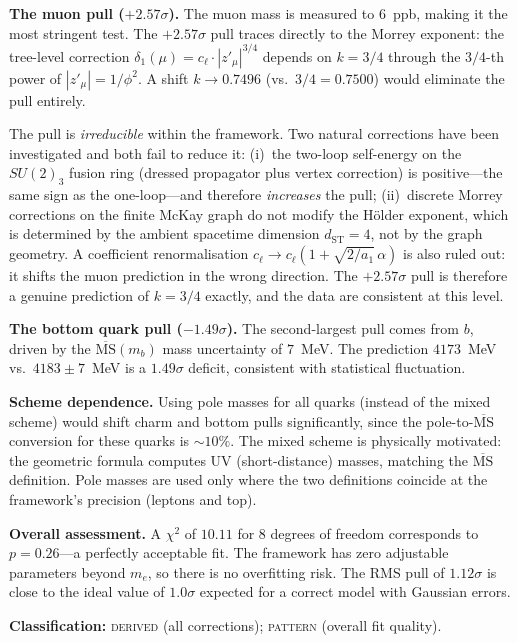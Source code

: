 \documentclass[12pt,a4paper]{article}
\theoremstyle{definition}
\begin{document}
\textbf{The muon pull ($+2.57\sigma$).}  The muon mass is measured to $6$~ppb, making it the most stringent test.  The $+2.57\sigma$ pull traces directly to the Morrey exponent: the tree-level correction $\delta_1(\mu) = c_\ell \cdot |z'_\mu|^{3/4}$ depends on $k = 3/4$ through the $3/4$-th power of $|z'_\mu| = 1/\phi^2$.  A shift $k \to 0.7496$ (vs.\ $3/4 = 0.7500$) would eliminate the pull entirely.

The pull is \emph{irreducible} within the framework.  Two natural corrections have been investigated and both fail to reduce it: (i)~the two-loop self-energy on the $SU(2)_3$ fusion ring (dressed propagator plus vertex correction) is positive---the same sign as the one-loop---and therefore \emph{increases} the pull; (ii)~discrete Morrey corrections on the finite McKay graph do not modify the H\"{o}lder exponent, which is determined by the ambient spacetime dimension $d_{\text{ST}} = 4$, not by the graph geometry.  A coefficient renormalisation $c_\ell \to c_\ell(1 + \sqrt{2/a_1}\,\alpha)$ is also ruled out: it shifts the muon prediction in the wrong direction.  The $+2.57\sigma$ pull is therefore a genuine prediction of $k = 3/4$ exactly, and the data are consistent at this level.

\textbf{The bottom quark pull ($-1.49\sigma$).}  The second-largest pull comes from $b$, driven by the $\overline{\text{MS}}(m_b)$ mass uncertainty of $7$~MeV.  The prediction $4173$~MeV vs.\ $4183 \pm 7$~MeV is a $1.49\sigma$ deficit, consistent with statistical fluctuation.

\textbf{Scheme dependence.}  Using pole masses for all quarks (instead of the mixed scheme) would shift charm and bottom pulls significantly, since the pole-to-$\overline{\text{MS}}$ conversion for these quarks is $\sim 10\%$.  The mixed scheme is physically motivated: the geometric formula computes UV (short-distance) masses, matching the $\overline{\text{MS}}$ definition.  Pole masses are used only where the two definitions coincide at the framework's precision (leptons and top).

\textbf{Overall assessment.}  A $\chi^2$ of $10.11$ for $8$ degrees of freedom corresponds to $p = 0.26$---a perfectly acceptable fit.  The framework has zero adjustable parameters beyond $m_e$, so there is no overfitting risk.  The RMS pull of $1.12\sigma$ is close to the ideal value of $1.0\sigma$ expected for a correct model with Gaussian errors.

\textbf{Classification:} \textsc{derived} (all corrections); \textsc{pattern} (overall fit quality).
\end{document}
